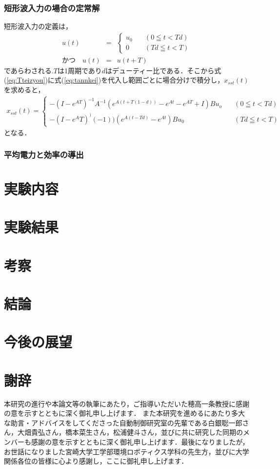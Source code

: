 \documentclass[12pt]{jarticle}
\begin{document}
\subsubsection{短形波入力の場合の定常解}
短形波入力の定義は，
\begin{eqnarray}
u(t ) &=& 
\begin{cases}
u_0 \quad &(0\leqq t <Td)  \\
0 \quad &(Td\leqq t <T) 
\end{cases}
\nonumber
\\
\label{eq:tannkei}
かつ\quad u(t)&=&u(t+T)
\end{eqnarray}
であらわされる.$T$は1周期であり$d$はデューティー比である．そこから式(\ref{eq:Tteizyou})に式(\ref{eq:tannkei})を代入し範囲ごとに場合分けで積分し，$x_{sst}(t)$を求めると，
\begin{eqnarray}
x_{sst}(t)=
\begin{cases}
	-(I-e^{AT})^{-1}A^{-1}(e^{A(t+T(1-d))}-e^{At}-e^{AT}+I)Bu_o &\quad (0\leqq t <Td)\\
	-(I-e^AT)^)(-1))(e^{A(t-Td)}-e^{At})Bu_0 & \quad(Td\leqq t <T)
\end{cases} 
\end{eqnarray}
となる．
\subsubsection{平均電力と効率の導出}
\clearpage
\section{実験内容}

\section{実験結果}

\section{考察}

\section{結論}

\section{今後の展望}

\clearpage
\section{謝辞}
 本研究の進行や本論文等の執筆にあたり，ご指導いただいた穂高一条教授に感謝の意を示すとともに深く御礼申し上げます．
また本研究を進めるにあたり多大な助言・アドバイスをしてくださった自動制御研究室の先輩である白銀聡一郎さん，大畑貴弘さん，橋本菜生さん，松浦健斗さん，並びに共に研究した同期のメンバーも感謝の意を示すとともに深く御礼申し上げます．最後になりましたが，お世話になりました宮崎大学工学部環境ロボティクス学科の先生方，並びに大学関係各位の皆様に心より感謝し，ここに御礼申し上げます．
\end{document}
